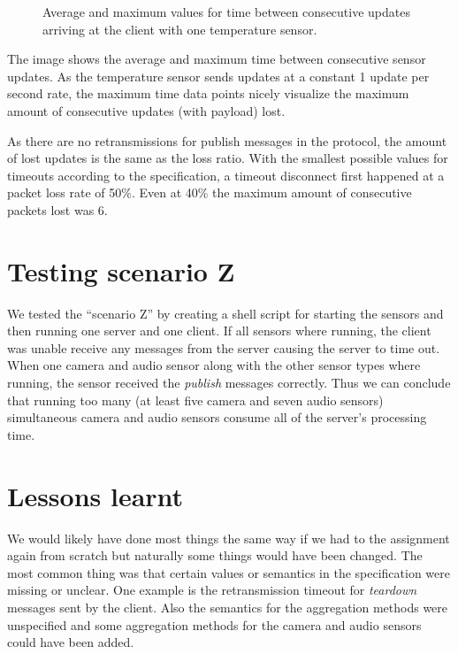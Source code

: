 \documentclass[a4paper]{article}
\begin{document}
\begin{figure}[h!]
\caption{Average and maximum values for time between consecutive updates arriving at the client with one temperature sensor.} \label{fig:lossdata}
\end{figure}

The image shows the average and maximum time between consecutive sensor updates.
As the temperature sensor sends updates at a constant 1 update per second rate,
the maximum time data points nicely visualize the maximum amount of consecutive
updates (with payload) lost.

As there are no retransmissions for publish messages in the protocol, the amount
of lost updates is the same as the loss ratio. With the smallest possible values
for timeouts according to the specification, a timeout disconnect first happened
at a packet loss rate of 50\%. Even at 40\% the maximum amount of consecutive
packets lost was 6.

\section{Testing scenario Z}
We tested the ``scenario Z'' by creating a shell script
for starting the sensors and then running one server and one client. If all
sensors where running, the client was unable receive any messages from the
server causing the server to time out. When one camera and audio sensor along
with the other sensor types where running, the sensor received the \emph{publish}
messages correctly. Thus we can conclude that running too many (at least five
camera and seven audio sensors) simultaneous camera and audio sensors consume
all of the server's processing time.

\section{Lessons learnt}
We would likely have done most things the same way if we had to the assignment
again from scratch but naturally some things would have been changed. The most
common thing was that certain values or semantics in the specification were
missing or unclear. One example is the retransmission timeout for \emph{teardown}
messages sent by the client. Also the semantics for the aggregation methods
were unspecified and some aggregation methods for the camera and audio sensors
could have been added. 

\end{document}
